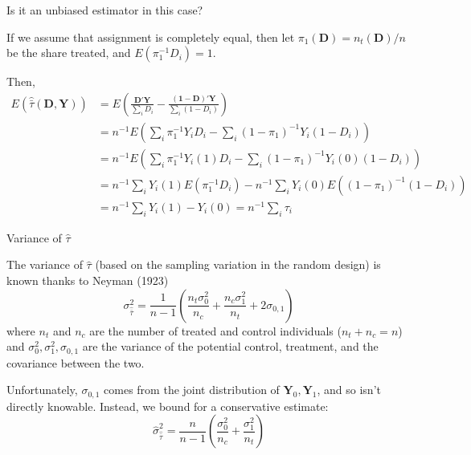 \documentclass[notes,11pt, aspectratio=169]{beamer}
\newenvironment{wideitemize}{\itemize\addtolength{\itemsep}{10pt}}{\enditemize}
\begin{document}
\begin{frame}
  
  \begin{wideitemize}
  \item Is it an unbiased estimator in this case?
  \item If we assume that assignment is completely equal, then let
    $\pi_{1}(\mathbf{D}) = n_{t}(\mathbf{D})/n$ be the share treated,
    and $E(\pi_{1}^{-1}D_{i}) = 1$.
    \item Then,
      \begin{align}
        E(\hat{\bar{\tau}}(\mathbf{D}, \mathbf{Y})) &= E\left(\frac{\mathbf{D}'\mathbf{Y}}{\sum_{i}D_{i}} - \frac{(\mathbf{1}-\mathbf{D})'\mathbf{Y}}{\sum_{i}(1-D_{i})}\right)\\
                                                    &=n^{-1}E\left(\sum_{i}\pi_{1}^{-1}Y_{i}D_{i} - \sum_{i}(1-\pi_{1})^{-1}Y_{i}(1-D_{i})\right)\\
                                                    &=n^{-1}E\left(\sum_{i}\pi_{1}^{-1}Y_{i}(1)D_{i} - \sum_{i}(1-\pi_{1})^{-1}Y_{i}(0)(1-D_{i})\right)\\
                                                    &=n^{-1}\sum_{i}Y_{i}(1)E\left(\pi_{1}^{-1}D_{i}\right) - n^{-1}\sum_{i}Y_{i}(0)E\left((1-\pi_{1})^{-1}(1-D_{i})\right)\\
        &=n^{-1}\sum_{i}Y_{i}(1) - Y_{i}(0) = n^{-1}\sum_{i}\tau_{i}
      \end{align}
    \end{wideitemize}
\end{frame}


\begin{frame}{Variance of $\hat{\tau}$}
  \begin{wideitemize}
  \item The variance of $\hat{\tau}$ (based on the sampling variation
    in the random design) is known thanks to Neyman (1923)
    \begin{equation}
      \sigma^{2}_{\hat{\bar{\tau}}} = \frac{1}{n-1}\left(\frac{n_{t}\sigma^{2}_{0}}{n_{c}} + \frac{n_{c} \sigma^{2}_{1}}{n_{t}} + 2\sigma_{0,1}\right)
    \end{equation}
    where $n_{t}$ and $n_{c}$ are the number of treated and control
    individuals ($n_{t} + n_{c} = n$) and
    $\sigma^{2}_{0}, \sigma^{2}_{1}, \sigma_{0,1}$ are the variance of
    the potential control, treatment, and the covariance between the
    two.
  \item Unfortunately, $\sigma_{0,1}$ comes from the joint
    distribution of $\mathbf{Y}_{0}, \mathbf{Y}_{1}$, and so isn't
    directly knowable. Instead, we bound for a conservative estimate:
    \begin{equation}
      \hat{\sigma}^{2}_{\hat{\bar{\tau}}} = \frac{n}{n-1}\left(\frac{\sigma^{2}_{0}}{n_{c}} + \frac{\sigma^{2}_{1}}{n_{t}}\right)
    \end{equation}
  \end{wideitemize}
\end{frame}
\end{document}
